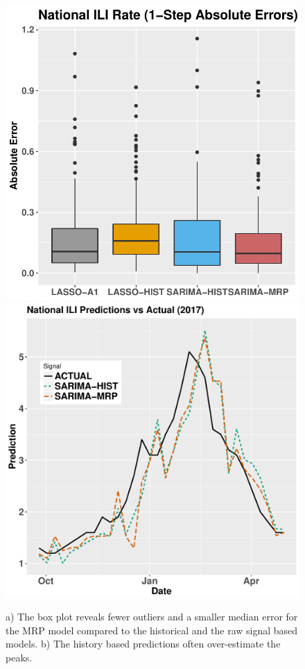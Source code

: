 \documentclass[fleqn,10pt]{wlscirep}
\providecommand{\DIFaddend}{} %
\providecommand{\DIFaddbeginFL}{} %
\providecommand{\DIFaddendFL}{} %
\providecommand{\DIFdelbeginFL}{} %
\providecommand{\DIFdelendFL}{} %
\begin{document}
 \DIFaddend \begin{figure}%
 \centering
 \DIFdelbeginFL %
\DIFdelendFL \DIFaddbeginFL \includegraphics[width=.5\linewidth]{USBox_h=1}\DIFaddendFL \\
 \DIFdelbeginFL %
\DIFdelendFL \DIFaddbeginFL \includegraphics[width=.5\linewidth]{US_Predictions_h=2}
 \DIFaddendFL \caption{a) The box plot reveals fewer outliers and a smaller median error for the MRP model compared to the historical and the raw signal based models. b) The history based predictions often over-estimate the peaks.}
  \label{fig:US_Box}
 \end{figure}



\end{document}
